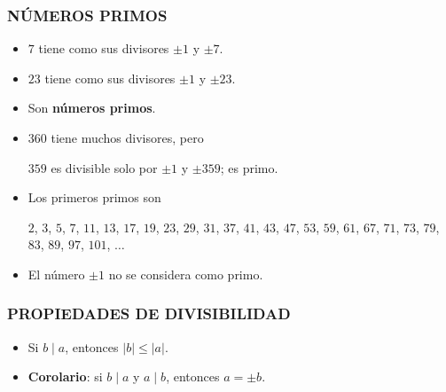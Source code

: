 \begin{frame}
  \frametitle{NÚMEROS PRIMOS}

  \begin{itemize}
  \item<2-> $7$ tiene como sus divisores $\pm 1$ y $\pm 7$.

  \item<3-> $23$ tiene como sus divisores $\pm 1$ y $\pm 23$.

  \item<4-> Son \textbf{números primos}.

  \item<5-> $360$ tiene muchos divisores, pero

    $359$ es divisible solo por $\pm 1$ y $\pm 359$; es primo.

  \item<6-> Los primeros primos son

    $2$, $3$, $5$, $7$, $11$, $13$, $17$, $19$, $23$, $29$, $31$, $37$, $41$,
    $43$, $47$, $53$, $59$, $61$, $67$, $71$, $73$, $79$, $83$, $89$, $97$,
    $101$, $\ldots$

  \item<7-> El número $\pm 1$ no se considera como primo.
  \end{itemize}
\end{frame}

\begin{frame}
  \frametitle{PROPIEDADES DE DIVISIBILIDAD}

  \begin{itemize}
  \item<2-> Si $b \mid a$, entonces $|b| \le |a|$.


  \item<4-> \textbf{Corolario}: si $b \mid a$ y $a \mid b$, entonces
    $a = \pm b$.

  \end{itemize}
\end{frame}

